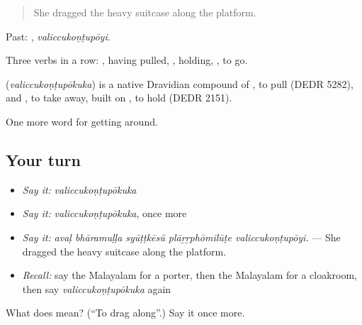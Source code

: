 \begin{quote}
She dragged the heavy suitcase along the platform.
\end{quote}

Past: , \emph{valiccukoṇṭupōyi}.

Three verbs in a row: , having pulled, , holding, , to go.

\begin{cousinweb}
\textbf{} (\emph{valiccukoṇṭupōkuka}) is a native Dravidian compound of , to pull (DEDR 5282), and , to take away, built on , to hold (DEDR 2151).
\end{cousinweb}

\begin{grammarlens}[title={What you've built}]
One more word for getting around.
\end{grammarlens}

\subsection*{Your turn}
\begin{itemize}
\raggedright
  \item \emph{Say it:} \emph{valiccukoṇṭupōkuka}
  \item \emph{Say it:} \emph{valiccukoṇṭupōkuka}, once more
  \item \emph{Say it:} \emph{avaḷ bhāramuḷḷa syūṭṭkēsŭ plāṟṟphōmilūṭe valiccukoṇṭupōyi.} — She dragged the heavy suitcase along the platform.
  \item \emph{Recall:} say the Malayalam for a porter, then the Malayalam for a cloakroom, then say \emph{valiccukoṇṭupōkuka} again
\end{itemize}

\begin{tcolorbox}[breakable,colback=teal!4,colframe=teal!35!black,title={Before you move on}]
What does  mean? (\textquotedblleft{}To drag along\textquotedblright{}.) Say it once more.
\end{tcolorbox}
